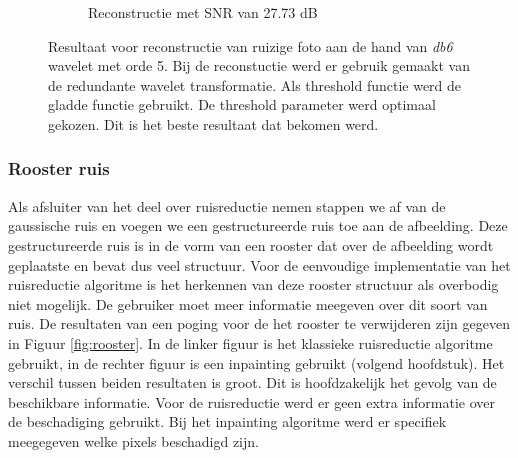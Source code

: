 \begin{figure}
\begin{subfigure}[b]{0.4\textwidth}
        \caption{Reconstructie met SNR van 27.73 dB}
        \label{fig:redundant_fixed}
    \end{subfigure}
    \caption{Resultaat voor reconstructie van ruizige foto aan de hand van  \textit{db6} wavelet met orde 5. Bij de reconstuctie werd er gebruik gemaakt van de redundante wavelet transformatie. Als threshold functie werd de gladde functie gebruikt. De threshold parameter werd optimaal gekozen. Dit is het beste resultaat dat bekomen werd. }\label{fig:redundant}
\end{figure}


\subsubsection{Rooster ruis}


Als afsluiter van het deel over ruisreductie nemen stappen we af van de gaussische ruis en voegen we een gestructureerde ruis toe aan de afbeelding.
Deze gestructureerde ruis is in de vorm van een rooster dat over de afbeelding wordt geplaatste en bevat dus veel structuur.
Voor de eenvoudige implementatie van het ruisreductie algoritme is het herkennen van deze rooster structuur als overbodig niet mogelijk.
De gebruiker moet meer informatie meegeven over dit soort van ruis.
De resultaten van een poging voor de het rooster te verwijderen zijn gegeven in Figuur \ref{fig:rooster}.
In de linker figuur is het klassieke ruisreductie algoritme gebruikt, in de rechter figuur is een inpainting gebruikt (volgend hoofdstuk).
Het verschil tussen beiden resultaten is groot.
Dit is hoofdzakelijk het gevolg van de beschikbare informatie.
Voor de ruisreductie werd er geen extra informatie over de beschadiging gebruikt.
Bij het inpainting algoritme werd er specifiek meegegeven welke pixels beschadigd zijn.


